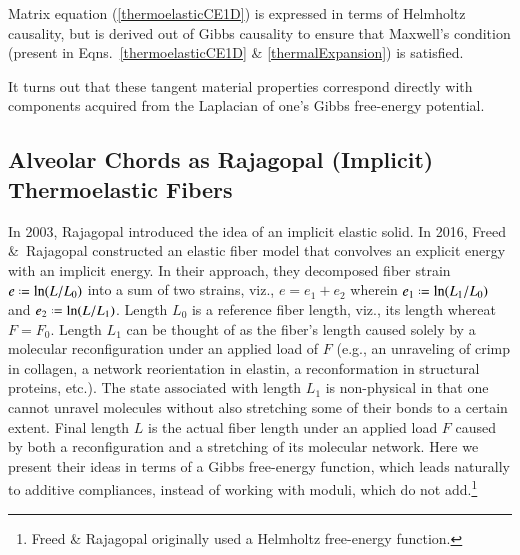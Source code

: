Matrix equation (\ref{thermoelasticCE1D}) is expressed in terms of Helmholtz causality, but is derived out of Gibbs causality to ensure that Maxwell's condition (present in Eqns.~\ref{thermoelasticCE1D} \& \ref{thermalExpansion}) is satisfied.

It turns out that these tangent material properties correspond directly with components acquired from the Laplacian of one's Gibbs free-energy potential.

\subsection{Alveolar Chords as Rajagopal (Implicit) Thermoelastic Fibers}

In 2003, Rajagopal \cite{Rajagopal03} introduced the idea of an implicit elastic solid.  In 2016, Freed \&\ Rajagopal \cite{FreedRajagopal16} constructed an elastic fiber model that convolves an explicit energy with an implicit energy.  In their approach, they decomposed fiber strain $e \defeq \ln (L / L_0)$ into a sum of two strains, viz., $e = e_1 + e_2$ wherein $e_1 \defeq \ln (L_1 / L_0)$ and $e_2 \defeq \ln (L / L_1)$.  Length $L_0$ is a reference fiber length, viz., its length whereat $F = F_0$.  Length $L_1$ can be thought of as the fiber's length caused solely by a molecular reconfiguration under an applied load of $F$ (e.g., an unraveling of crimp in collagen, a network reorientation in elastin, a reconformation in structural proteins, etc.).  The state associated with length $L_1$ is non-physical in that one cannot unravel molecules without also stretching some of their bonds to a certain extent.  Final length $L$ is the actual fiber length under an applied load $F$ caused by both a reconfiguration and a stretching of its molecular network.  Here we present their ideas in terms of a Gibbs free-energy function, which leads naturally to additive compliances, instead of working with moduli, which do not add.\footnote{%
    Freed \& Rajagopal \cite{FreedRajagopal16} originally used a Helmholtz free-energy function.
}

